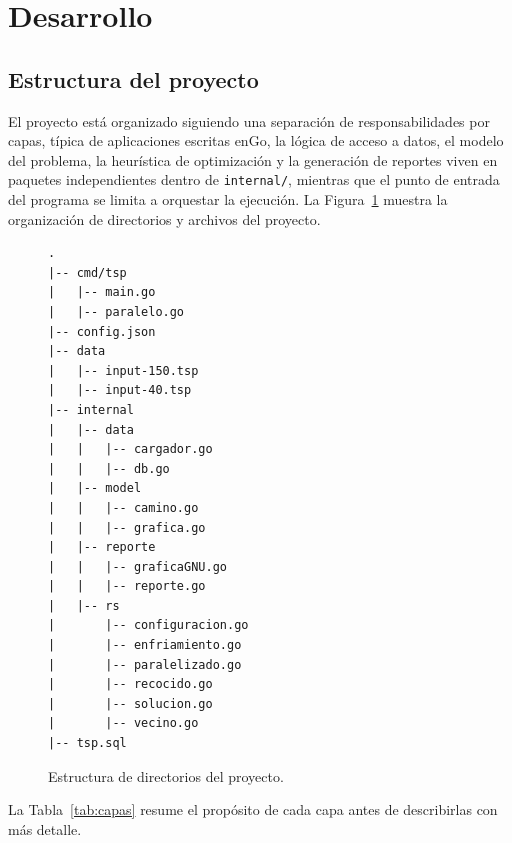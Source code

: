 \documentclass[12pt,a4paper]{article}
\begin{document}
\section{Desarrollo}

\subsection{Estructura del proyecto}
\label{sec:estructura}

El proyecto está organizado siguiendo una separación de responsabilidades por capas, típica de aplicaciones escritas enGo, la lógica de acceso a datos, el modelo del problema, la heurística de optimización y la generación de reportes viven en paquetes independientes dentro de \texttt{internal/}, mientras que el punto de entrada del programa se limita a orquestar la ejecución.
La Figura~\ref{fig:arbol} muestra la organización de directorios y archivos del proyecto.

\begin{figure}[H]
    \centering
    \begin{minipage}{0.92\textwidth}
\begin{lstlisting}
.
|-- cmd/tsp
|   |-- main.go
|   |-- paralelo.go
|-- config.json
|-- data
|   |-- input-150.tsp
|   |-- input-40.tsp
|-- internal
|   |-- data
|   |   |-- cargador.go
|   |   |-- db.go
|   |-- model
|   |   |-- camino.go
|   |   |-- grafica.go
|   |-- reporte
|   |   |-- graficaGNU.go
|   |   |-- reporte.go
|   |-- rs
|       |-- configuracion.go
|       |-- enfriamiento.go
|       |-- paralelizado.go
|       |-- recocido.go
|       |-- solucion.go
|       |-- vecino.go
|-- tsp.sql
\end{lstlisting}
    \end{minipage}
    \caption{Estructura de directorios del proyecto.}
    \label{fig:arbol}
\end{figure}

La Tabla~\ref{tab:capas} resume el propósito de cada capa antes de describirlas con más detalle.
\end{document}
